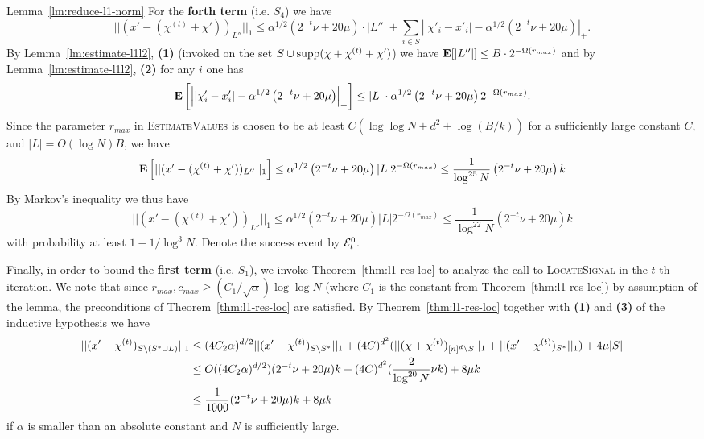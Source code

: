 \begin{proofof}{Lemma~\ref{lm:reduce-l1-norm}}
For the {\bf forth term} (i.e. $S_4$) we have 
$$
||(x'-(\chi^{(t)}+\chi'))_{L''}||_1\leq \alpha^{1/2}\left(2^{-t}\nu+20\mu\right)\cdot |L''|+\sum_{i\in S} \left||\chi'_i-x'_i|-\alpha^{1/2}\left(2^{-t}\nu+20\mu\right)\right|_+.
$$
By  Lemma~\ref{lm:estimate-l1l2}, {\bf (1)} (invoked on the set $S\cup \operatorname{supp}(\chi+\chi^{(t)}+\chi')$) we have ${\bf \mbox{\bf E}}[|L''|]\leq B\cdot 2^{-\Omega(r_{max})}$ and by  Lemma~\ref{lm:estimate-l1l2}, {\bf (2)} 
for any $i$ one has 
$$
{\bf \mbox{\bf E}}\left[\left||\chi'_i-x'_i|-\alpha^{1/2}\left(2^{-t}\nu+20\mu\right)\right|_+\right]\leq |L|\cdot \alpha^{1/2}\left(2^{-t}\nu+20\mu\right) 2^{-\Omega(r_{max})}.
$$
Since the parameter $r_{max}$ in \textsc{EstimateValues} is chosen to be at least $C(\log\log N+d^2+\log (B/k))$ for a sufficiently large constant $C$, and $|L|=O(\log N)B$, we have 
\begin{equation*}
{\bf \mbox{\bf E}}\left[||(x'-(\chi^{(t)}+\chi'))_{L''}||_1\right]\leq \alpha^{1/2}\left(2^{-t}\nu+20\mu\right) |L| 2^{-\Omega(r_{max})}\leq \frac1{\log^{25} N}\left(2^{-t}\nu+20\mu\right)k
\end{equation*}
By Markov's inequality we thus have 
\begin{equation}\label{eq:l2p-11}
||(x'-(\chi^{(t)}+\chi'))_{L''}||_1\leq \alpha^{1/2}\left(2^{-t}\nu+20\mu\right) |L| 2^{-\Omega(r_{max})}\leq \frac1{\log^{22} N}\left(2^{-t}\nu+20\mu\right)k
\end{equation}
 with probability at least $1-1/\log^3 N$. Denote the success event by ${\mathcal{E}}_t^0$.

Finally, in order to bound the {\bf first term} (i.e. $S_1$), we invoke Theorem~\ref{thm:l1-res-loc} to analyze the call to \textsc{LocateSignal} in the $t$-th iteration. 
We note that since $r_{max}, c_{max}\geq (C_1/\sqrt{\alpha})\log\log N$ (where $C_1$ is the constant from Theorem~\ref{thm:l1-res-loc}) by assumption of the lemma, the preconditions of Theorem~\ref{thm:l1-res-loc} are satisfied. By Theorem~\ref{thm:l1-res-loc} together with {\bf (1)} and {\bf (3)} of the inductive hypothesis we have 
\begin{equation}\label{eq:l111}
\begin{split}
||(x'-\chi^{(t)})_{S\setminus (S^*\cup L)}||_1&\leq (4C_2\alpha)^{d/2} ||(x'-\chi^{(t)})_{S\setminus S^*}||_1+(4C)^{d^2}( ||(\chi+\chi^{(t)})_{{[n]^d}\setminus S}||_1+||(x'-\chi^{(t)})_{S^*}||_1)+4\mu |S|\\
&\leq O((4C_2\alpha)^{d/2}) (2^{-t}\nu+20\mu)k+(4C)^{d^2}(\frac{2}{\log^{20} N} \nu k)+8\mu k\\
&\leq \frac1{1000} (2^{-t}\nu+20\mu)k+8\mu k\\
\end{split}
\end{equation}
if $\alpha$ is smaller than an absolute constant and $N$ is sufficiently large.


\end{proofof}
